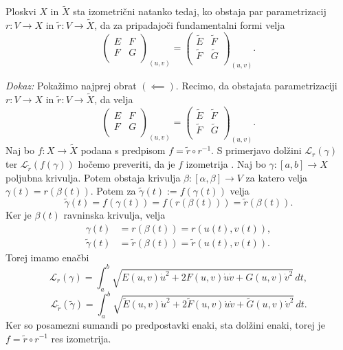 \begin{izrek}
\label{izr_izometricnost_in_prva_forma}
Ploskvi $X$ in $\tilde{X}$ sta izometrični natanko tedaj, ko obstaja par parametrizacij
$r : V \to X$ in $\tilde{r}: V \to  \tilde{X}$, da za pripadajoči
fundamentalni formi velja 
\begin{equation*} 
\begin{pmatrix}
	E & F \\
	F & G \\
\end{pmatrix}_{(u,v)}
=
\begin{pmatrix}
	\tilde{E}  & \tilde{F}  \\
	\tilde{F}  & \tilde{G}  \\
\end{pmatrix}_{(u,v)}
.\end{equation*}
\end{izrek}
{\em Dokaz:\/}
Pokažimo najprej obrat $(\impliedby)$. Recimo, da obstajata parametrizaciji $r: V
\to  X$ in $\tilde{r}: V \to  \tilde{X} $, da velja 
\begin{equation*} 
  \begin{pmatrix}
    E & F \\
    F & G \\
  \end{pmatrix}_{(u,v)}
  =
\begin{pmatrix}
	\tilde{E}  & \tilde{F}  \\
	\tilde{F}  & \tilde{G}  \\
\end{pmatrix}_{(u,v)}
.\end{equation*} 
Naj bo $f: X \to  \tilde{X}$ podana s predpisom $f = \tilde{r} \circ  r^{-1}$. S primerjavo dolžini $\mathcal{L}_r(\gamma)$ ter
$\mathcal{L}_{\tilde{r}}(f(\gamma))$ hočemo preveriti, da je $f$
izometrija . Naj bo $\gamma: [a,b] \to  X$ poljubna krivulja. Potem obstaja krivulja $\beta:
[\alpha,\beta] \to  V$ za katero velja $\gamma(t) = r(\beta(t))$.
Potem za $\tilde{\gamma}(t) := f(\gamma(t))$ velja 
\begin{equation*}\tilde{\gamma}(t) =  f(\gamma(t)) = f(r(\beta(t))) = \tilde{r}(\beta(t)).\end{equation*}
Ker je $\beta(t)$ ravninska krivulja, velja 
\begin{align*}
    \gamma(t) &= r(\beta(t)) = r(u(t), v(t)), \\
    \tilde{\gamma}(t) &= \tilde{r} (\beta(t)) = \tilde{r} (u(t), v(t)).   
\end{align*}
Torej imamo enačbi 
\begin{equation*} \mathcal{L}_r(\gamma) = \int_{a}^{b} \sqrt{E(u,v)\dot{u}^2 +
2F(u,v)\dot{u}\dot{v} + G(u,v)\dot{v}^2} \, dt, \end{equation*}
\begin{equation*} \mathcal{L}_{\tilde{r}}(\tilde{\gamma}) = \int_{a}^{b} \sqrt{\tilde{E} (u,v)\dot{u}^2 +
2\tilde{F}(u,v)\dot{u}\dot{v} + \tilde{G}(u,v)\dot{v}^2} \, dt.  \end{equation*}
Ker so posamezni sumandi po predpostavki enaki, sta dolžini enaki, torej je $f =
\tilde{r} \circ r^{-1}$ res izometrija.

